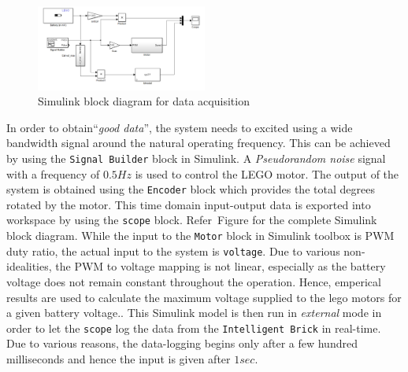 \documentclass[paper=a4, fontsize=11pt]{scrartcl}
\numberwithin{equation}{section}        %
\numberwithin{figure}{section}          %
\numberwithin{table}{section}           %
\begin{document}
\begin{figure}[!hbp]
	\includegraphics[width=0.5\textwidth]{tf_daq_model}
	\caption{Simulink block diagram for data acquisition}
	\label{fig:tf_daq_model}
\end{figure}

In order to obtain``\emph{good data}'', the system needs to excited using a wide bandwidth signal around the natural operating frequency. This can  be achieved by using the \verb|Signal Builder| block in Simulink. A \emph{Pseudorandom noise} signal with a frequency of $0.5Hz$ is used to control the LEGO motor. The output of the system is obtained using the \verb|Encoder| block which provides the total degrees rotated by the motor. This time domain input-output data is exported into workspace by using the \verb|scope| block. Refer~Figure\cite{fig:tf_daq_model} for the complete Simulink block diagram. While the input to the \verb|Motor| block in Simulink toolbox is PWM duty ratio, the actual input to the system is \verb|voltage|. Due to various non-idealities, the PWM to voltage mapping is not linear, especially as the battery voltage does not remain constant throughout the operation. Hence, emperical results are used to calculate the maximum voltage supplied to the lego motors for a given battery voltage.\cite{ref:Yamamoto}. This Simulink model is then run in \emph{external} mode in order to let the \verb|scope| log the data from the \verb|Intelligent Brick| in real-time. Due to various reasons, the data-logging begins only after a few hundred milliseconds and hence the input is given after $1 sec$. 
\end{document}
